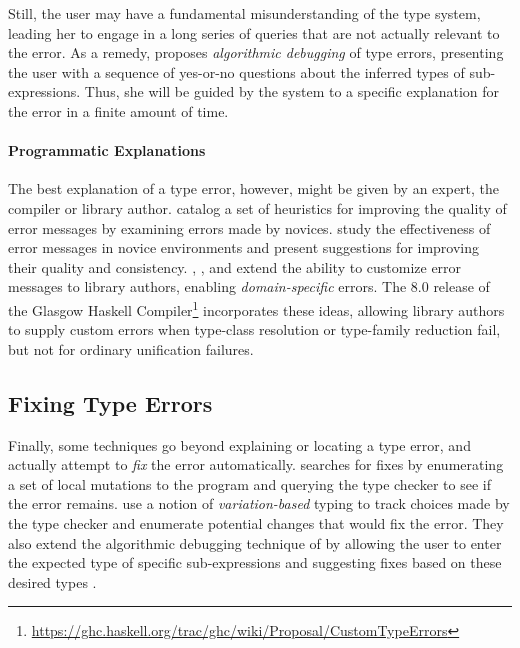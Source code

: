 Still, the user may have a fundamental misunderstanding of the type
system, leading her to engage in a long series of queries that are not actually relevant to the error.
%
As a remedy, \citet{Chitil2001-td} proposes \emph{algorithmic debugging}
of type errors, presenting the user with a sequence of yes-or-no
questions about the inferred types of sub-expressions.
%
Thus, she will be guided by the system to a specific explanation for the
error in a finite amount of time.

\paragraph{Programmatic Explanations}
%
The best explanation of a type error, however, might be given by an
expert, \eg the compiler or library author.
%
\citet{Hage2006-hc} catalog a set of heuristics for
improving the quality of error messages by examining errors made by
novices.
%
\citet{Marceau2011-ok,Marceau2011-cy} study the effectiveness of error
messages in novice environments and present suggestions for improving
their quality and consistency.
%
\citet{Heeren2003-db}, \citet{Christiansen2014-qc}, and
\citet{Serrano2016-oo} extend the ability to customize error messages to
library authors, enabling \emph{domain-specific} errors.
%
The 8.0 release of the
Glasgow Haskell Compiler\footnote{\url{https://ghc.haskell.org/trac/ghc/wiki/Proposal/CustomTypeErrors}}
incorporates these ideas, allowing library authors to supply
custom errors when type-class resolution or type-family reduction fail,
but not for ordinary unification failures.

\subsection{Fixing Type Errors}
\label{sec:fixing-type-errors}
Finally, some techniques go beyond explaining or locating a type error,
and actually attempt to \emph{fix} the error automatically.
%
\citet{Lerner2007-dt} searches for fixes by enumerating a
set of local mutations to the program and querying the type checker to
see if the error remains.
%
\citet{Chen2014-gd} use a notion of \emph{variation-based} typing to
track choices made by the type checker and enumerate potential
changes that would fix the error.
%
They also extend the algorithmic debugging technique of
\citeauthor{Chitil2001-td} by allowing the user to enter the expected
type of specific sub-expressions and suggesting fixes based on these
desired types \citep{Chen2014-vm}.

